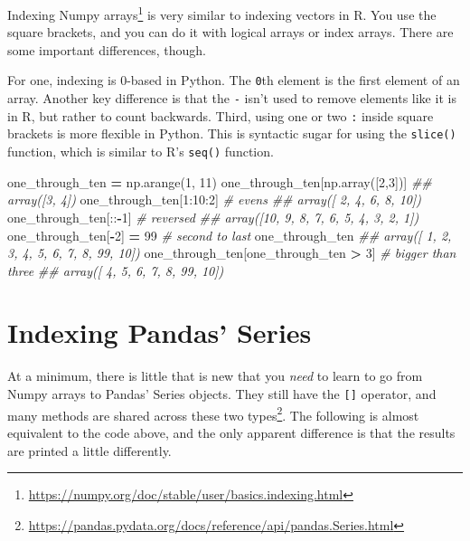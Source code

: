 \documentclass[
  12pt,
]{krantz}
\makeatletter
\newenvironment{Shaded}{\begin{snugshade}}{\end{snugshade}}
\newcommand{\CommentTok}[1]{\textcolor[rgb]{0.37,0.37,0.37}{\textit{#1}}}
\newcommand{\DecValTok}[1]{\textcolor[rgb]{0.06,0.06,0.06}{#1}}
\newcommand{\NormalTok}[1]{#1}
\newcommand{\OperatorTok}[1]{\textcolor[rgb]{0.43,0.43,0.43}{\textbf{#1}}}
\renewcommand{\href}[2]{#2\footnote{\url{#1}}}
\newenvironment{kframe}{%
\medskip{}
\setlength{\fboxsep}{.8em}
 \def\at@end@of@kframe{}%
 \ifinner\ifhmode%
  \def\at@end@of@kframe{\end{minipage}}%
  \begin{minipage}{\columnwidth}%
 \fi\fi%
 \def\FrameCommand##1{\hskip\@totalleftmargin \hskip-\fboxsep
 \colorbox{shadecolor}{##1}\hskip-\fboxsep
     \hskip-\linewidth \hskip-\@totalleftmargin \hskip\columnwidth}%
 \MakeFramed {\advance\hsize-\width
   \@totalleftmargin\z@ \linewidth\hsize
   \@setminipage}}%
 {\par\unskip\endMakeFramed%
 \at@end@of@kframe}
\renewenvironment{Shaded}{\begin{kframe}}{\end{kframe}}
\makeatother
\begin{document}
\href{https://numpy.org/doc/stable/user/basics.indexing.html}{Indexing Numpy arrays} is very similar to indexing vectors in R. You use the square brackets, and you can do it with logical arrays or index arrays. There are some important differences, though.

For one, indexing is 0-based in Python. The \texttt{0}th element is the first element of an array. Another key difference is that the \texttt{-} isn't used to remove elements like it is in R, but rather to count backwards. Third, using one or two \texttt{:} inside square brackets is more flexible in Python. This is syntactic sugar for using the \texttt{slice()} function, which is similar to R's \texttt{seq()} function.

\begin{Shaded}
\begin{Highlighting}[]
\NormalTok{one\_through\_ten }\OperatorTok{=}\NormalTok{ np.arange(}\DecValTok{1}\NormalTok{, }\DecValTok{11}\NormalTok{)}
\NormalTok{one\_through\_ten[np.array([}\DecValTok{2}\NormalTok{,}\DecValTok{3}\NormalTok{])]}
\CommentTok{\#\# array([3, 4])}
\NormalTok{one\_through\_ten[}\DecValTok{1}\NormalTok{:}\DecValTok{10}\NormalTok{:}\DecValTok{2}\NormalTok{] }\CommentTok{\# evens}
\CommentTok{\#\# array([ 2,  4,  6,  8, 10])}
\NormalTok{one\_through\_ten[::}\OperatorTok{{-}}\DecValTok{1}\NormalTok{] }\CommentTok{\# reversed}
\CommentTok{\#\# array([10,  9,  8,  7,  6,  5,  4,  3,  2,  1])}
\NormalTok{one\_through\_ten[}\OperatorTok{{-}}\DecValTok{2}\NormalTok{] }\OperatorTok{=} \DecValTok{99} \CommentTok{\# second to last}
\NormalTok{one\_through\_ten}
\CommentTok{\#\# array([ 1,  2,  3,  4,  5,  6,  7,  8, 99, 10])}
\NormalTok{one\_through\_ten[one\_through\_ten }\OperatorTok{\textgreater{}} \DecValTok{3}\NormalTok{] }\CommentTok{\# bigger than three}
\CommentTok{\#\# array([ 4,  5,  6,  7,  8, 99, 10])}
\end{Highlighting}
\end{Shaded}

\hypertarget{indexing-pandas-series}{%
\section{Indexing Pandas' Series}\label{indexing-pandas-series}}

At a minimum, there is little that is new that you \emph{need} to learn to go from Numpy arrays to Pandas' Series objects. They still have the \texttt{{[}{]}} operator, and \href{https://pandas.pydata.org/docs/reference/api/pandas.Series.html}{many methods are shared across these two types}. The following is almost equivalent to the code above, and the only apparent difference is that the results are printed a little differently.
\end{document}
